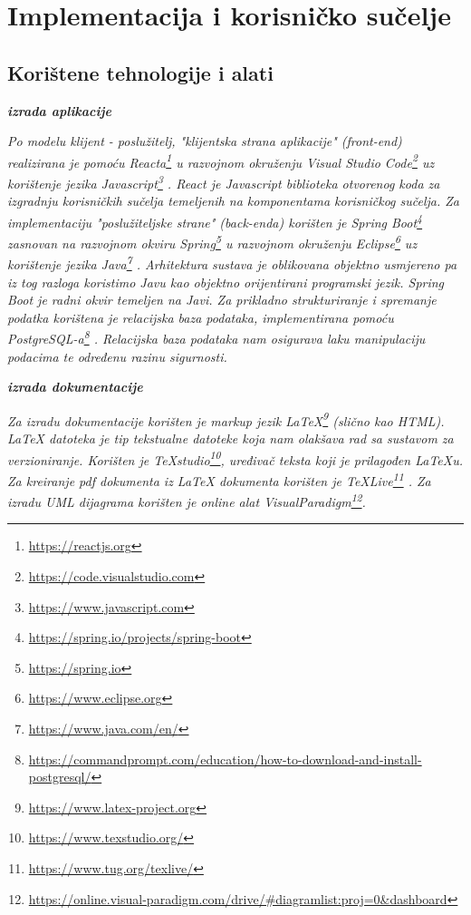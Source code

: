 \chapter{Implementacija i korisničko sučelje}
		
		
		\section{Korištene tehnologije i alati}
		\bigskip
			
		\textbf{\textit{izrada aplikacije}}
		\bigskip
		\bigskip
		
			 \textit{ Po modelu klijent - poslužitelj, "klijentska strana aplikacije" (front-end) realizirana je pomoću Reacta\footnote{\url{https://reactjs.org}} u razvojnom okruženju Visual Studio Code\footnote{\url{https://code.visualstudio.com}} uz korištenje jezika Javascript\footnote{\url{https://www.javascript.com}} .  React je Javascript biblioteka otvorenog koda za izgradnju korisničkih sučelja temeljenih na komponentama korisničkog sučelja. Za implementaciju "poslužiteljske strane" (back-enda) korišten je Spring Boot\footnote{\url{https://spring.io/projects/spring-boot}} zasnovan na razvojnom okviru Spring\footnote{\url{https://spring.io}} u razvojnom okruženju Eclipse\footnote{\url{https://www.eclipse.org}} uz korištenje jezika Java\footnote{\url{https://www.java.com/en/}} . Arhitektura sustava je oblikovana objektno usmjereno pa iz tog razloga koristimo Javu kao objektno orijentirani programski jezik. Spring Boot je radni okvir temeljen na Javi. Za prikladno strukturiranje i spremanje podatka korištena je relacijska baza podataka, implementirana pomoću PostgreSQL-a\footnote{\url{https://commandprompt.com/education/how-to-download-and-install-postgresql/}} . Relacijska baza podataka nam osigurava laku manipulaciju podacima te određenu razinu sigurnosti.}
			 
		\bigskip
			\bigskip
			 
			 \textbf{\textit{izrada dokumentacije}}
			 \bigskip
			 

    				 \textit{Za izradu dokumentacije korišten je markup jezik LaTeX\footnote{\url{https://www.latex-project.org}} (slično kao HTML). LaTeX datoteka je tip tekstualne datoteke koja nam olakšava rad sa sustavom za verzioniranje. Korišten je TeXstudio\footnote{\url{https://www.texstudio.org/}}, uređivač teksta koji je prilagođen LaTeXu. Za kreiranje pdf dokumenta iz LaTeX dokumenta korišten je TeXLive\footnote{\url{https://www.tug.org/texlive/}} . Za izradu UML dijagrama korišten je online alat VisualParadigm\footnote{\url{https://online.visual-paradigm.com/drive/\#diagramlist:proj=0&dashboard}}. }
				 \bigskip
			 
